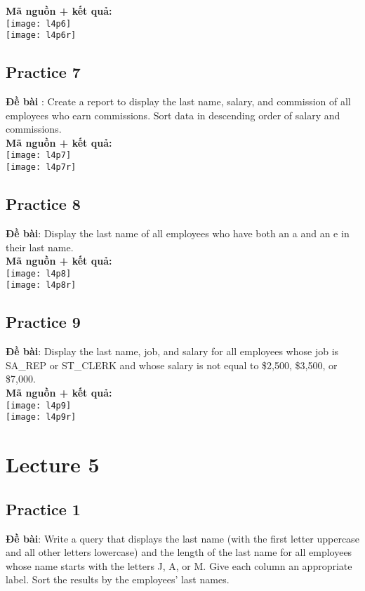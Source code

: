 \documentclass[a4paper]{report}
\begin{document}
\textbf{Mã nguồn + kết quả: }\\
\texttt{[image: l4p6]}\\
\texttt{[image: l4p6r]}

\subsection{Practice 7}\noindent
\textbf{Đề bài} : Create a report to display the last name, salary, and commission of all employees who earn commissions. Sort data in descending order of salary and commissions.\\

\textbf{Mã nguồn + kết quả: }\\
\texttt{[image: l4p7]}\\
\texttt{[image: l4p7r]}

\subsection{Practice 8}\noindent
\textbf{Đề bài}: Display the last name of all employees who have both an a and an e in their last name.\\

\textbf{Mã nguồn + kết quả: }\\
\texttt{[image: l4p8]}\\
\texttt{[image: l4p8r]}

\subsection{Practice 9}\noindent
\textbf{Đề bài}: Display the last name, job, and salary for all employees whose job is SA\_REP or ST\_CLERK and whose salary is not equal to \$2,500, \$3,500, or \$7,000. \\

\textbf{Mã nguồn + kết quả: }\\
\texttt{[image: l4p9]}\\
\texttt{[image: l4p9r]}

\section{Lecture 5}
\subsection{Practice 1}\noindent
\textbf{Đề bài}: Write a query that displays the last name (with the first letter uppercase and all other letters lowercase) and the length of the last name for all employees whose name starts with the letters J, A, or M. Give each column an appropriate label. Sort the results by the employees’ last names.\\
\end{document}
